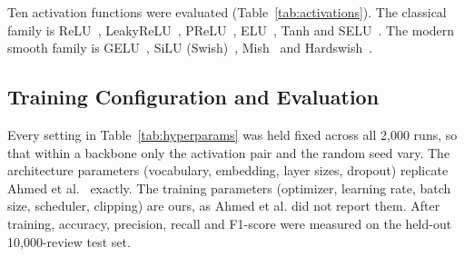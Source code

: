 \documentclass[conference,a4paper]{IEEEtran}
\begin{document}
Ten activation functions were evaluated
(Table~\ref{tab:activations}). The classical family is
ReLU~\cite{nair2010}, LeakyReLU~\cite{maas2013},
PReLU~\cite{he2015}, ELU~\cite{clevert2015}, Tanh and
SELU~\cite{klambauer2017}. The modern smooth family is
GELU~\cite{hendrycks2016}, SiLU (Swish)~\cite{ramachandran2017},
Mish~\cite{misra2020} and Hardswish~\cite{howard2019}.

\begin{table}[htbp]
  \caption{Activation Functions: Families and Key Properties}
  \label{tab:activations}
  \centering\footnotesize
  \setlength{\tabcolsep}{3pt}
  \renewcommand{\arraystretch}{1.05}
\end{table}

\subsection{Training Configuration and Evaluation}

Every setting in Table~\ref{tab:hyperparams} was held fixed
across all 2{,}000 runs, so that within a backbone only the
activation pair and the random seed vary. The architecture
parameters (vocabulary, embedding, layer sizes, dropout)
replicate Ahmed et al.~\cite{ahmed2025} exactly. The training
parameters (optimizer, learning rate, batch size, scheduler,
clipping) are ours, as Ahmed et al. did not report them.
After training, accuracy, precision, recall and
F1-score were measured on the held-out 10,000-review test set.
\end{document}
